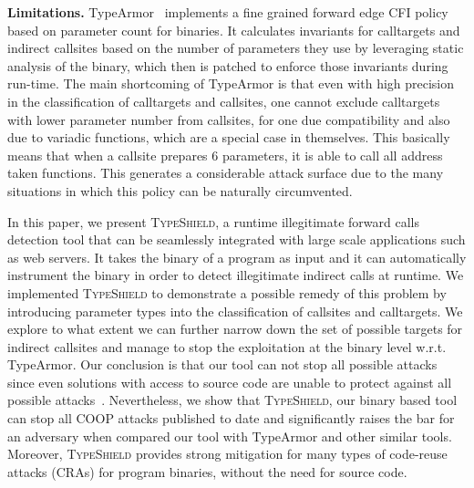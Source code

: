 \textbf{Limitations.} TypeArmor~\cite{veen:typearmor} implements a fine grained forward edge CFI 
policy based on parameter count for binaries. It calculates invariants for calltargets and indirect callsites based on
the number of parameters they use by leveraging static analysis of the binary, which then is
patched to enforce those invariants during run-time. The main shortcoming of TypeArmor is that
even with high precision in the classification of 
calltargets and callsites, one cannot exclude calltargets with lower parameter number from 
callsites, for one due compatibility and also due to variadic functions, which are a special
case in themselves. This basically means that when a callsite prepares 6 parameters, it is 
able to call all address taken functions. This generates a considerable attack surface due to the many
situations in which this policy can be naturally circumvented.

In this paper, we present \textsc{TypeShield}, a runtime illegitimate forward 
calls detection tool that can be seamlessly integrated with large scale applications such as web servers.
It takes the binary of a program as input and it can automatically instrument the binary in order
to detect illegitimate indirect calls at runtime. 
We implemented \textsc{TypeShield} to demonstrate a possible remedy of this problem by introducing
parameter types into the classification of callsites and calltargets. We explore to
what extent we can further narrow down the set of possible targets for indirect callsites
and manage to stop the exploitation at the binary level w.r.t. TypeArmor.
Our conclusion is that our tool can not stop all possible attacks since even solutions 
with access to source code are unable to protect against all possible attacks~\cite{carlini:bending}.
Nevertheless, we show that \textsc{TypeShield}, our binary based tool can stop all 
COOP attacks published to date and significantly raises the bar for an adversary when compared our tool with 
TypeArmor and other similar tools. 
Moreover, \textsc{TypeShield} provides strong mitigation for many types of code-reuse attacks
(CRAs) for program binaries, without the need for source code. 

